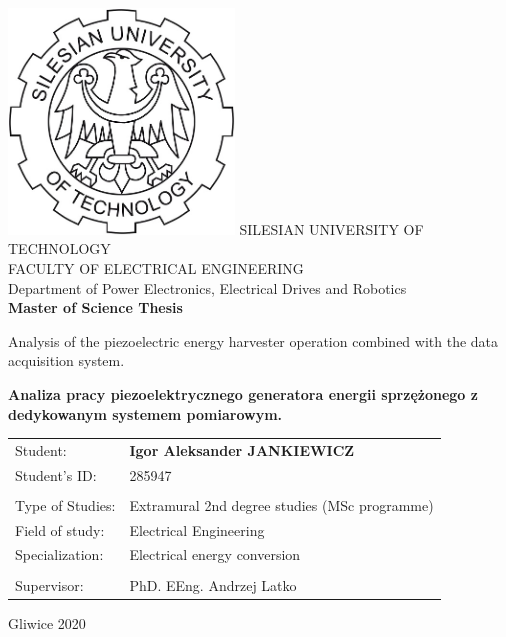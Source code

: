 \documentclass[12pt,a4paper]{article}
\begin{document}
\begin{titlepage}
    \centering
    \includegraphics[width=6cm]{logo.jpg} %
    \vskip1cm
    {\Large
        SILESIAN UNIVERSITY OF TECHNOLOGY\\
        FACULTY OF ELECTRICAL ENGINEERING\\
        \vskip0.5cm
        Department of Power Electronics, Electrical Drives and Robotics\\
    }
    \vskip1cm
    {\bfseries\huge
    Master of Science Thesis\\
    }
    \vskip0.5cm
    {\bfseries\large
    
Analysis of the piezoelectric energy harvester operation combined with the data acquisition system. \\
    }
    \vskip0.5cm
    {\bfseries\normalsize
    Analiza pracy piezoelektrycznego generatora energii sprzężonego z dedykowanym systemem pomiarowym. \\
    }
    \vskip 1.5cm
    {\large
    \begin{tabular}{p{4cm} p{10cm}}
    Student: & {\bfseries\Large Igor Aleksander JANKIEWICZ}\\
    Student's ID: & 285947\\
        &   \\
    Type of Studies: & Extramural 2nd degree studies (MSc programme)\\
    Field of study: & Electrical Engineering\\
    Specialization: & Electrical energy conversion\\
        &   \\
    Supervisor: & PhD. EEng. Andrzej Latko\\
    \end{tabular}
    }
    \vskip2cm
    {\large
    Gliwice 2020}
\end{titlepage}
\end{document}
